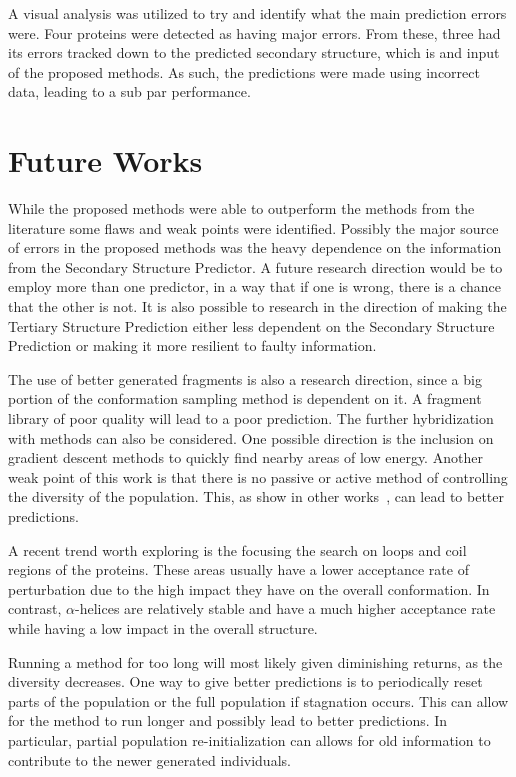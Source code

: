 A visual analysis was utilized to try and identify what the main prediction
errors were. Four proteins were detected as having major errors. From these,
three had its errors tracked down to the predicted secondary structure, which is
and input of the proposed methods. As such, the predictions were made using
incorrect data, leading to a sub par performance.

\section{Future Works}\label{sec:future_works}

While the proposed methods were able to outperform the methods from the
literature some flaws and weak points were identified. Possibly the major
source of errors in the proposed methods was the heavy dependence on the
information from the Secondary Structure Predictor. A future research direction
would be to employ more than one predictor, in a way that if one is wrong,
there is a chance that the other is not. It is also possible to research in the
direction of making the Tertiary Structure Prediction either less dependent on
the Secondary Structure Prediction or making it more resilient to faulty
information.

The use of better generated fragments is also a research direction, since a big
portion of the conformation sampling method is dependent on it. A fragment
library of poor quality will lead to a poor prediction.
The further hybridization with methods can also be considered. One possible
direction is the inclusion on gradient descent methods to quickly find nearby
areas of low energy.
Another weak point of this work is that there is no passive or active method of
controlling the diversity of the population. This, as show in other
works~\cite{narloch2016diversification,simoncini2017balancing}, can lead to
better predictions.

A recent trend worth exploring is the focusing the search on loops and coil
regions of the proteins. These areas usually have a lower acceptance rate of
perturbation due to the high impact they have on the overall conformation.  In
contrast, $\alpha$-helices are relatively stable and have a much higher
acceptance rate while having a low impact in the overall structure.

Running a method for too long will most likely given diminishing returns, as
the diversity decreases. One way to give better predictions is to periodically
reset parts of the population or the full population if stagnation occurs. This
can allow for the method to run longer and possibly lead to better predictions.
In particular, partial population re-initialization can allows for old information
to contribute to the newer generated individuals.

